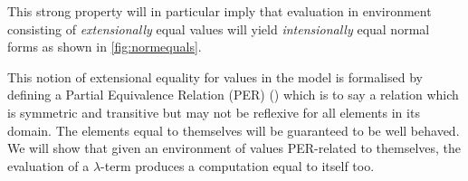This strong property will in particular imply that evaluation in
environment consisting of \emph{extensionally} equal values will
yield \emph{intensionally} equal normal forms as shown in
\cref{fig:normequals}.

%





This notion of extensional equality for values in the model is formalised
by defining a Partial Equivalence Relation (PER)
(\cite{mitchell1996foundations}) which is to say a
relation which is symmetric and transitive but may not be reflexive for
all elements in its domain. The elements equal to themselves will be
guaranteed to be well behaved. We will show that given an environment
of values PER-related to themselves, the evaluation of a $λ$-term
produces a computation equal to itself too.

